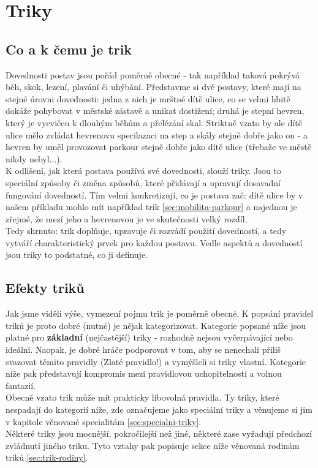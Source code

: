 \chapter{Triky}
\label{chap:triky}

\section{Co a k čemu je trik}
\label{sec:coakcemu-trik}
Dovednosti postav jsou pořád poměrně obecné - tak například taková  pokrývá běh, skok, lezení, plavání či uhýbání. Představme si dvě postavy, které mají  na stejné úrovni dovednosti: jedna z nich je mrštné dítě ulice, co se velmi hbitě dokáže pohybovat v městské zástavě a unikat dostižení; druhá je stepní hevren, který je vycvičen k dlouhým běhům a přelézání skal. Striktně vzato by ale dítě ulice mělo zvládat hevrenovu specilazaci na step a skály stejně dobře jako on - a hevren by uměl provozovat parkour stejně dobře jako dítě ulice (třebaže ve městě nikdy nebyl...).\\
K odlišení, jak která postava používá své dovednosti, slouží triky. Jsou to speciální způsoby či změna způsobů, které přidávají a upravují dosavadní fungování dovedností. Tím velmi konkretizují, co je postava zač: dítě ulice by v našem příkladu mohlo mít například trik  \ref{sec:mobilita-parkour} a najednou je zřejmé, že mezí jeho a hevrenovou  je ve skutečnosti velký rozdíl.\\
Tedy shrnuto: trik doplňuje, upravuje či rozvádí použití dovedností, a tedy vytváří charakteristický prvek pro každou postavu. Vedle aspektů a dovedností jsou triky to podstatné, co ji definuje.


\section{Efekty triků}
\label{sec:trik-efekty}
Jak jsme viděli výše, vymezení pojmu trik je poměrně obecné. K popsání pravidel triků je proto dobré (nutné) je nějak kategorizovat. Kategorie popsané níže jsou platné pro \textbf{základní} (nejčastější) triky - rozhodně nejsou vyčerpávající nebo ideální. Naopak, je dobré hráče podporovat v tom, aby se nenechali příliš svazovat těmito pravidly (Zlaté pravidlo!) a vymýšleli si triky vlastní. Kategorie níže pak představují kompromis mezi pravidlovou uchopitelností a volnou fantazií.\\
Obecně vzato trik může mít prakticky libovolná pravidla. Ty triky, které nespadají do kategorií níže, zde označujeme jako speciální triky a věnujeme si jim v kapitole věnované specialitám \ref{sec:specialni-triky}.\\
Některé triky jsou mocnější, pokročilejší než jiné, některé zase vyžadují předchozí zvládnutí jiného triku. Tyto vztahy pak popisuje sekce níže věnovaná rodinám triků \ref{sec:trik-rodiny}. 

